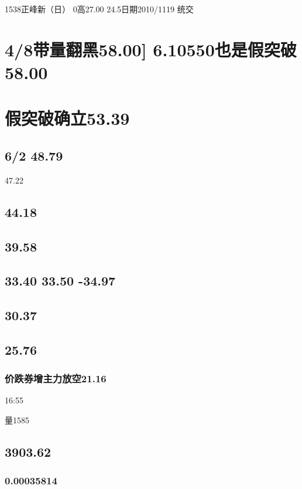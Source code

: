 \documentclass{article}
\begin{document}
1538正峰新（日） 0高27.00 24.5日期2010/1119 统交

\section{4/8带量翻黑58.00] 6.10550也是假突破58.00}

\section{假突破确立53.39}

\subsection{6/2 48.79}

47.22

\subsection{44.18}

\subsection{39.58}

\subsection{33.40 33.50 -34.97}

\subsection{30.37}

\subsection{25.76}

\subsubsection{价跌券增主力放空21.16}

16:55

量1585

\subsection{3903.62}

\subsubsection{0.00035814}
\end{document}
